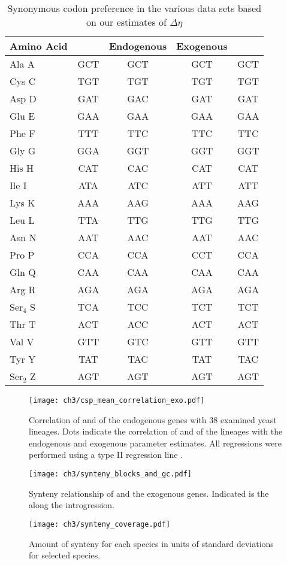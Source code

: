 \begin{table}
    \centering
    \caption{Synonymous codon preference in the various data sets based on our estimates of $\Delta \eta$}
\begin{tabular}{  l  c  c  c  c  }
\hline
	Amino Acid & \gossypii & Endogenous & Exogenous & \kluyveri \\ \hline
	Ala A & GCT & GCT & GCT & GCT \\ 
	Cys C & TGT & TGT & TGT & TGT \\ 
	Asp D & GAT & GAC & GAT & GAT \\ 
	Glu E & GAA & GAA & GAA & GAA \\ 
	Phe F & TTT & TTC & TTC & TTC \\ 
	Gly G & GGA & GGT & GGT & GGT \\ 
	His H & CAT & CAC & CAT & CAT \\ 
	Ile I & ATA & ATC & ATT & ATT \\ 
	Lys K & AAA & AAG & AAA & AAG \\ 
	Leu L & TTA & TTG & TTG & TTG \\ 
	Asn N & AAT & AAC & AAT & AAC \\ 
	Pro P & CCA & CCA & CCT & CCA \\ 
	Gln Q & CAA & CAA & CAA & CAA \\ 
	Arg R & AGA & AGA & AGA & AGA \\ 
	Ser$_4$ S & TCA & TCC & TCT & TCT \\ 
	Thr T & ACT & ACC & ACT & ACT \\ 
	Val V & GTT & GTC & GTT & GTT \\ 
	Tyr Y & TAT & TAC & TAT & TAC \\ 
	Ser$_2$ Z & AGT & AGT & AGT & AGT \\ \hline
\end{tabular}
    \label{tab:codon_pref_deta}
\end{table}
\clearpage

\null
\vfill
\begin{figure}[H]
     \centering
	\texttt{[image: ch3/csp\_mean\_correlation\_exo.pdf]}
	\caption{Correlation of \DM and \DE of the endogenous genes with 38 examined yeast lineages. 
	Dots indicate the correlation of \DM and \DE of the lineages with the endogenous and exogenous parameter estimates. 
	All regressions were performed using a type II regression line \citep{SokalAndRohlf1981}.}
	\label{fig:csp_endo_comp}
\end{figure}
\null
\vfill
\clearpage
\null
\vfill
\begin{figure}[H]
     \centering
	\texttt{[image: ch3/synteny\_blocks\_and\_gc.pdf]}
	\caption{Synteny relationship of \gossypii and the exogenous genes. Indicated is the \GC along the introgression.}
	\label{fig:synt_rel}
\end{figure}
\null
\vfill
\clearpage
\null
\vfill
\begin{figure}[H]
     \centering
	\texttt{[image: ch3/synteny\_coverage.pdf]}
	\caption{Amount of synteny for each species in units of standard deviations for selected species.}
	\label{fig:synteny_species}
\end{figure}
\null
\vfill
\clearpage
\null
\vfill

